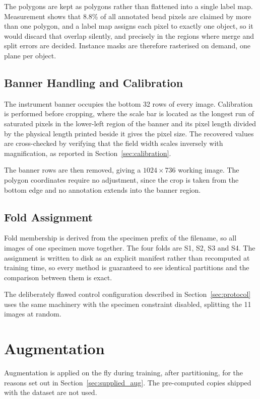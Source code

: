 The polygons are kept as polygons rather than flattened into a single label map.
Measurement shows that 8.8\% of all annotated bead pixels are claimed by more than
one polygon, and a label map assigns each pixel to exactly one object, so it would
discard that overlap silently, and precisely in the regions where merge and split
errors are decided. Instance masks are therefore rasterised on demand, one plane
per object.

\subsection{Banner Handling and Calibration}

The instrument banner occupies the bottom 32 rows of every image. Calibration
is performed before cropping, where the scale bar is located as the longest run of
saturated pixels in the lower-left region of the banner and its pixel length divided
by the physical length printed beside it gives the pixel size. The recovered values
are cross-checked by verifying that the field width scales inversely with
magnification, as reported in Section~\ref{sec:calibration}.

The banner rows are then removed, giving a $1024 \times 736$ working image. The
polygon coordinates require no adjustment, since the crop is taken from the bottom
edge and no annotation extends into the banner region.

\subsection{Fold Assignment}

Fold membership is derived from the specimen prefix of the filename, so all
images of one specimen move together. The four folds are S1, S2, S3 and S4. The
assignment is written to disk as an explicit manifest rather than recomputed at
training time, so every method is guaranteed to see identical partitions and
the comparison between them is exact.

The deliberately flawed control configuration described in
Section~\ref{sec:protocol} uses the same machinery with the specimen constraint
disabled, splitting the 11 images at random.

\section{Augmentation}

Augmentation is applied on the fly during training, after partitioning, for the
reasons set out in Section~\ref{sec:supplied_aug}. The pre-computed copies shipped
with the dataset are not used.

